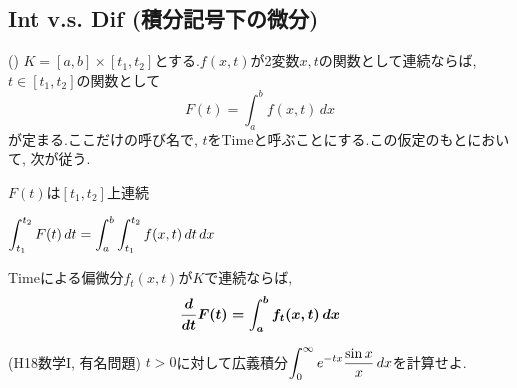 \subsection{Int v.s. Dif (積分記号下の微分)}
\besha
\begin{theo} ()
$K=[a,b]\times [t_1,t_2]$とする.$f(x,t)$が2変数$x,t$の関数として連続ならば, $t\in [t_1,t_2]$の関数として
\[F(t) = \int_{a}^{b} f(x,t)\, dx\]
が定まる.ここだけの呼び名で, $t$をTimeと呼ぶことにする.この仮定のもとにおいて, 次が従う.
\ben
\item $F(t)$は$[t_1,t_2]$上連続
\item $\displaystyle\int_{t_1}^{t_2} F(t)\, dt = \int_{a}^{b}\int_{t_1}^{t_2}f(x,t)\, dt\, dx$
\item Timeによる偏微分$f_{t}(x,t)$が$K$で連続ならば,
\[{\mbox{\boldmath $\dfrac{d}{dt}F(t) = \displaystyle\int_{a}^{b} f_t(x,t)\, dx$}}\]
\een
\end{theo}
\ensha
\begin{egprob} (H18数学I, 有名問題)
$t>0$に対して広義積分$\displaystyle\int_{0}^{\infty} e^{-tx}\dfrac{\sin{x}}{x}\, dx$を計算せよ.
\end{egprob}
